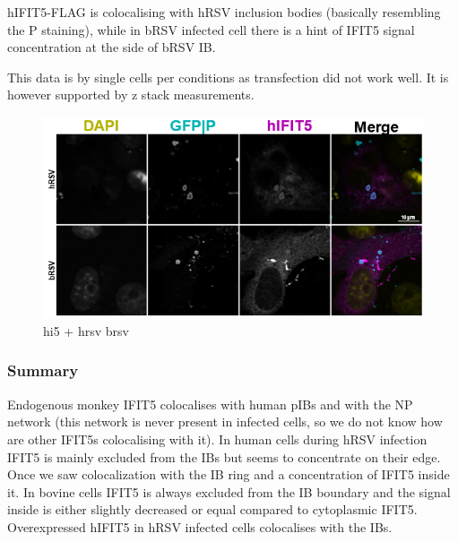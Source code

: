 hIFIT5-FLAG is colocalising with hRSV inclusion bodies (basically resembling the P staining), while in bRSV infected cell there is a hint of IFIT5 signal concentration at the side of bRSV IB.

This data is by single cells per conditions as transfection did not work well. It is however supported by z stack measurements.


\begin{figure}
    \centering
    \includegraphics[width=1\linewidth]{09. Chapter 4/Figs/05. IFIT5/05. hi5-hrsv-brsv.png}
    \caption[hi5 + hrsv brsv]{hi5 + hrsv brsv}
    \label{fig:hi5 + hrsv brsv}
\end{figure}

\subsubsection{Summary} \label{Summary-i5}
Endogenous monkey IFIT5 colocalises with human pIBs and with the NP network (this network is never present in infected cells, so we do not know how are other IFIT5s colocalising with it). In human cells during hRSV infection IFIT5 is mainly excluded from the IBs but seems to concentrate on their edge. Once we saw colocalization with the IB ring and a concentration of IFIT5 inside it. In bovine cells IFIT5 is always excluded from the IB boundary and the signal inside is either slightly decreased or equal compared to cytoplasmic IFIT5. Overexpressed hIFIT5 in hRSV infected cells colocalises with the IBs.
